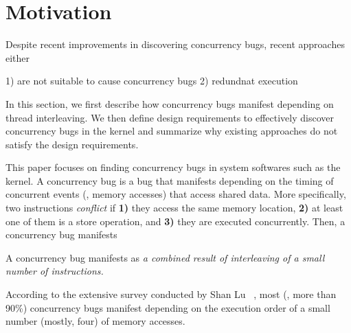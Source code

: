 \section{Motivation}
\label{s:motivation}


Despite recent improvements in discovering concurrency bugs, recent approaches either 

1) are not suitable to cause concurrency bugs
2) redundnat execution




In this section, we first describe how concurrency bugs manifest
depending on thread interleaving.
%
We then define design requirements to effectively discover concurrency
bugs in the kernel and summarize why existing approaches do not
satisfy the design requirements.


%
This paper focuses on finding concurrency bugs in system softwares
such as the kernel.
%
A concurrency bug is a bug that manifests depending on the timing of
concurrent events (\eg, memory accesses) that access shared data.
%
More specifically, two instructions \textit{conflict} if \textbf{1)}
they access the same memory location, \textbf{2)} at least one of them
is a store operation, and \textbf{3)} they are executed concurrently.
%
Then, a concurrency bug manifests 


A concurrency bug manifests as \textit{a combined result of
  interleaving of a small number of instructions.}




According to the extensive survey conducted by Shan Lu
\etal~\cite{learningfrommistakes}, most (\ie, more than 90\%)
concurrency bugs manifest depending on the execution order of a small
number (mostly, four) of memory accesses.




